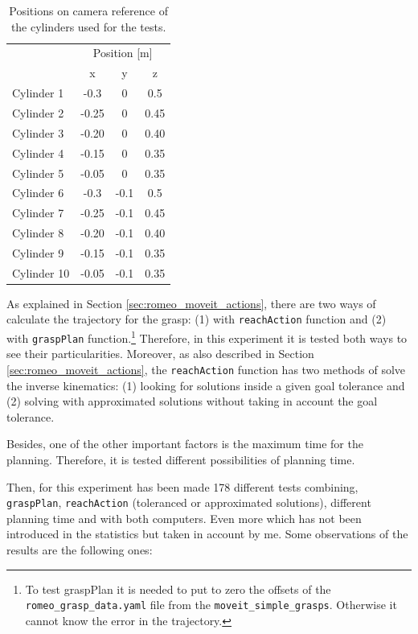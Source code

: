 \documentclass[12pt,a4paper,final,twoside,openright]{report}
\begin{document}
\begin{table}
\begin{center}
\begin{tabular}{|l|c|c|c|}
\hline
& \multicolumn{3}{|c|}{Position [m]} \\ \cline{2-4}
& x & y & z \\ \hline
Cylinder 1 & -0.3 & 0 & 0.5 \\ \hline
Cylinder 2 & -0.25 & 0 & 0.45 \\ \hline
Cylinder 3 & -0.20 & 0 & 0.40 \\ \hline
Cylinder 4 & -0.15 & 0 & 0.35 \\ \hline
Cylinder 5 & -0.05 & 0 & 0.35 \\ \hline
Cylinder 6 & -0.3 & -0.1 & 0.5 \\ \hline
Cylinder 7 & -0.25 & -0.1 & 0.45 \\ \hline
Cylinder 8 & -0.20 & -0.1 & 0.40 \\ \hline
Cylinder 9 & -0.15 & -0.1 & 0.35 \\ \hline
Cylinder 10 & -0.05 & -0.1 & 0.35 \\ \hline
\end{tabular}
\caption{Positions on camera reference of the cylinders used for the tests.\label{tab:exp_move_sim_goals}}
\end{center}
\end{table}

As explained in Section \ref{sec:romeo_moveit_actions}, there are two ways of calculate the trajectory for the grasp: (1) with \texttt{reachAction} function and (2) with \texttt{graspPlan} function.\footnote{To test graspPlan it is needed to put to zero the offsets of the \texttt{romeo\_grasp\_data.yaml} file from the \texttt{moveit\_simple\_grasps}. Otherwise it cannot know the error in the trajectory.} Therefore, in this experiment it is tested both ways to see their particularities. Moreover, as also described in Section \ref{sec:romeo_moveit_actions}, the \texttt{reachAction} function has two methods of solve the inverse kinematics: (1) looking for solutions inside a given goal tolerance and (2) solving with approximated solutions without taking in account the goal tolerance. 

Besides, one of the other important factors is the maximum time for the planning. Therefore, it is tested different possibilities of planning time.

Then, for this experiment has been made 178 different tests combining, \texttt{graspPlan}, \texttt{reachAction} (toleranced or approximated solutions), different planning time and with both computers. Even more which has not been introduced in the statistics but taken in account by me. Some observations of the results are the following ones:
\end{document}
